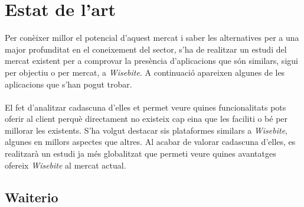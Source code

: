
\chapter{Estat de l'art} %

\label{Chapter2} %

Per conèixer millor el potencial d'aquest mercat i saber les alternatives per a una major profunditat en el coneixement del sector, s'ha de realitzar un estudi del mercat existent per a comprovar la presència d'aplicacions que són similars, sigui per objectiu o per mercat, a \textit{Wisebite}. A continuació apareixen algunes de les aplicacions que s'han pogut trobar.
\\\\
El fet d'analitzar cadascuna d'elles et permet veure quines funcionalitats pots oferir al client perquè directament no existeix cap eina que les faciliti o bé per millorar les existents. S'ha volgut destacar sis plataformes similars a \textit{Wisebite}, algunes en millors aspectes que altres. Al acabar de valorar cadascuna d'elles, es realitzarà un estudi ja més globalitzat que permeti veure quines avantatges ofereix \textit{Wisebite} al mercat actual.


\section{Waiterio}

